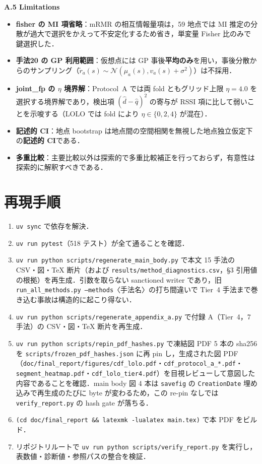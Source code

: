 \documentclass[a4paper,twocolumn]{ltjsarticle}
\begin{document}
\smallskip\noindent\textbf{A.5\; Limitations}\;
\begin{itemize}
  \item \textbf{fisher の MI 項省略}：mRMR の相互情報量項は，59 地点では MI 推定の分散が過大で選択をかえって不安定化するため省き，単変量 Fisher 比のみで鍵選択した．
  \item \textbf{手法20 の GP 利用範囲}：仮想点には GP 事後\textbf{平均のみ}を用い，事後分散からのサンプリング（$\tilde r_a(s)\sim\mathcal N(\mu_a(s),v_a(s)+\sigma^2)$）は不採用．
  \item \textbf{joint\_fp の $\eta$ 境界解}：Protocol~A では両 fold ともグリッド上限 $\eta{=}4.0$ を選択する境界解であり，検出項 $(\hat d-\hat q)^2$ の寄与が RSSI 項に比して弱いことを示唆する（LOLO では fold により $\eta\in\{0,2,4\}$ が混在）．
  \item \textbf{記述的 CI}：地点 bootstrap は地点間の空間相関を無視した地点独立仮定下の\textbf{記述的 CI}である．
  \item \textbf{多重比較}：主要比較以外は探索的で多重比較補正を行っておらず，有意性は探索的に解釈すべきである．
\end{itemize}

\section{再現手順}

\begin{enumerate}
  \item \texttt{uv sync} で依存を解決．
  \item \texttt{uv run pytest}（518 テスト）が全て通ることを確認．
  \item \texttt{uv run python scripts/regenerate\_main\_body.py} で本文 15 手法の CSV・図・TeX 断片（および \texttt{results/method\_diagnostics.csv}，\S3 引用値の根拠）を再生成．引数を取らない sanctioned writer であり，旧 \texttt{run\_all\_methods.py --methods}〈手法名〉の打ち間違いで Tier~4 手法まで巻き込む事故は構造的に起こり得ない．
  \item \texttt{uv run python scripts/regenerate\_appendix\_a.py} で付録 A（Tier~4，7 手法）の CSV・図・TeX 断片を再生成．
  \item \texttt{uv run python scripts/repin\_pdf\_hashes.py} で凍結図 PDF 5 本の sha256 を \texttt{scripts/frozen\_pdf\_hashes.json} に再 pin し，生成された図 PDF（\texttt{doc/final\_report/figures/cdf\_lolo.pdf}・\texttt{cdf\_protocol\_a\_*.pdf}・\texttt{segment\_heatmap.pdf}・\texttt{cdf\_lolo\_tier4.pdf}）を目視レビューして意図した内容であることを確認．main body 図 4 本は \texttt{savefig} の \texttt{CreationDate} 埋め込みで再生成のたびに byte が変わるため，この re-pin なしでは \texttt{verify\_report.py} の hash gate が落ちる．
  \item \texttt{(cd doc/final\_report \&\& latexmk -lualatex main.tex)} で本 PDF をビルド．
  \item リポジトリルートで \texttt{uv run python scripts/verify\_report.py} を実行し，表数値・診断値・参照パスの整合を検証．
\end{enumerate}
\end{document}
